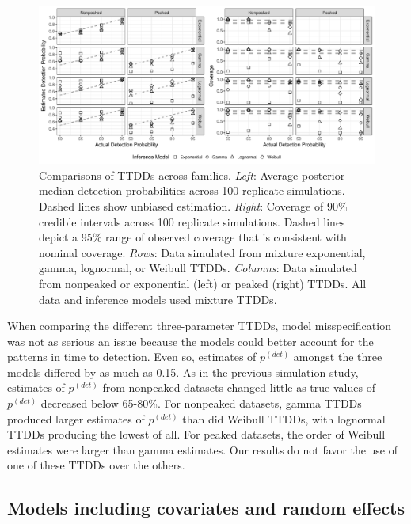 \documentclass[12pt]{article}
\newcommand{\pdet}{p^{(det)}}
\begin{document}
\begin{figure}\centering
\includegraphics[width=\textwidth]{"Sims/SimZero/family_fig"} %
\caption{
Comparisons of TTDDs across families.  \textit{Left}: Average posterior median detection probabilities across 100 replicate simulations.  Dashed lines show unbiased estimation.   \textit{Right}: Coverage of 90\% credible intervals across 100 replicate simulations.  Dashed lines depict a 95\% range of observed coverage that is consistent with nominal coverage.  \textit{Rows}:  Data simulated from mixture exponential, gamma, lognormal, or Weibull TTDDs.  \textit{Columns}: Data simulated from nonpeaked or exponential (left) or peaked (right) TTDDs.  All data and inference models used mixture TTDDs.
}
\label{fig:family_fig}
\end{figure}



When comparing the different three-parameter TTDDs, model misspecification was not as serious an issue because the models could better account for the patterns in time to detection.
Even so, estimates of $\pdet$ amongst the three models differed by as much as 0.15.
As in the previous simulation study, estimates of $\pdet$ from nonpeaked datasets changed little as true values of $\pdet$ decreased below 65-80\%.
For nonpeaked datasets, gamma TTDDs produced larger estimates of $\pdet$ than did Weibull TTDDs, with lognormal TTDDs producing the lowest of all.
For peaked datasets, the order of Weibull estimates were larger than gamma estimates.
Our results do not favor the use of one of these TTDDs over the others.


\subsection{Models including covariates and random effects}\label{sec:simfull}
\end{document}
